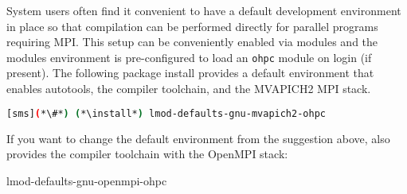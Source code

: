 System users often find it convenient to have a default development environment
in place so that compilation can be performed directly for parallel programs
requiring MPI. This setup can be conveniently enabled via modules and the \OHPC{}
modules environment is pre-configured to load an \texttt{ohpc} module on login
(if present). The following package install provides a default
environment that enables autotools, the \GNU{} compiler toolchain, and the
MVAPICH2 MPI stack.

\begin{lstlisting}[language=bash]
[sms](*\#*) (*\install*) lmod-defaults-gnu-mvapich2-ohpc
\end{lstlisting}

\begin{center}
\begin{tcolorbox}[]
\small
If you want to change the default environment from the suggestion above, \OHPC{}
also provides the \GNU{} compiler toolchain with the OpenMPI stack:
\begin{itemize*}
\item lmod-defaults-gnu-openmpi-ohpc
\end{itemize*}
\end{tcolorbox}
\end{center}
